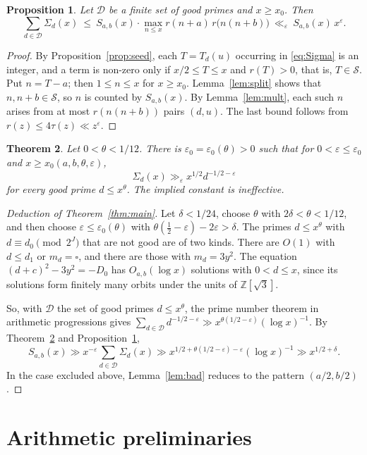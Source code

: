 \documentclass[11pt]{amsart}
\newtheorem{theorem}{Theorem}[section]
\newtheorem{proposition}[theorem]{Proposition}
\theoremstyle{remark}
\theoremstyle{definition}
\numberwithin{equation}{section}
\newcommand{\Sc}{\mathcal{S}}
\newcommand{\Z}{\mathbb{Z}}
\newcommand{\eps}{\varepsilon}
\begin{document}
\begin{proposition}\label{prop:reduction}
Let $\mathcal D$ be a finite set of good primes and $x\ge x_0$. Then
\[
\sum_{d\in\mathcal D}\Sigma_d(x)\ \le\ S_{a,b}(x)\cdot\max_{n\le x}r(n+a)\,r\bigl(n(n+b)\bigr)\ \ll_\eps\ S_{a,b}(x)\,x^{\eps}.
\]
\end{proposition}

\begin{proof}
By Proposition~\ref{prop:seed}, each $T=T_d(u)$ occurring in \eqref{eq:Sigma} is an integer, and a term is non-zero only if $x/2\le T\le x$ and $r(T)>0$, that is, $T\in\Sc$. Put $n=T-a$; then $1\le n\le x$ for $x\ge x_0$. Lemma~\ref{lem:split} shows that $n,n+b\in\Sc$, so $n$ is counted by $S_{a,b}(x)$. By Lemma~\ref{lem:mult}, each such $n$ arises from at most $r(n(n+b))$ pairs $(d,u)$. The last bound follows from $r(z)\le 4\tau(z)\ll z^{\eps}$.
\end{proof}

\begin{theorem}\label{thm:Sigma}
Let $0<\theta<1/12$. There is $\eps_0=\eps_0(\theta)>0$ such that for $0<\eps\le\eps_0$ and $x\ge x_0(a,b,\theta,\eps)$,
\[
\Sigma_d(x)\gg_{\eps}x^{1/2}d^{-1/2-\eps}
\]
for every good prime $d\le x^{\theta}$. The implied constant is ineffective.
\end{theorem}

\begin{proof}[Deduction of Theorem~\ref{thm:main}]
Let $\delta<1/24$, choose $\theta$ with $2\delta<\theta<1/12$, and then choose $\eps\le\eps_0(\theta)$ with $\theta(\frac12-\eps)-2\eps>\delta$. The primes $d\le x^{\theta}$ with $d\equiv d_0\pmod{2^J}$ that are not good are of two kinds. There are $O(1)$ with $d\le d_1$ or $m_d=\square$, and there are those with $m_d=3y^2$. The equation $(d+c)^2-3y^2=-D_0$ has $O_{a,b}(\log x)$ solutions with $0<d\le x$, since its solutions form finitely many orbits under the units of $\Z[\sqrt3]$.

So, with $\mathcal D$ the set of good primes $d\le x^\theta$, the prime number theorem in arithmetic progressions gives $\sum_{d\in\mathcal D}d^{-1/2-\eps}\gg x^{\theta(1/2-\eps)}(\log x)^{-1}$. By Theorem~\ref{thm:Sigma} and Proposition~\ref{prop:reduction},
\[
S_{a,b}(x)\gg x^{-\eps}\sum_{d\in\mathcal D}\Sigma_d(x)\gg x^{1/2+\theta(1/2-\eps)-\eps}(\log x)^{-1}\gg x^{1/2+\delta}.
\]
In the case excluded above, Lemma~\ref{lem:bad} reduces to the pattern $(a/2,b/2)$.
\end{proof}

\section{Arithmetic preliminaries}
\end{document}
